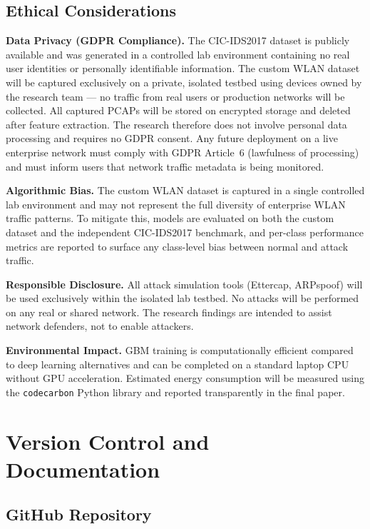 \documentclass[12pt,a4paper]{article}
\begin{document}
\subsection{Ethical Considerations}

\textbf{Data Privacy (GDPR Compliance).}
The CIC-IDS2017 dataset is publicly available and was generated in a controlled
lab environment containing no real user identities or personally identifiable
information. The custom WLAN dataset will be captured exclusively on a private,
isolated testbed using devices owned by the research team --- no traffic from
real users or production networks will be collected. All captured PCAPs will be
stored on encrypted storage and deleted after feature extraction. The research
therefore does not involve personal data processing and requires no GDPR consent.
Any future deployment on a live enterprise network must comply with GDPR Article~6
(lawfulness of processing) and must inform users that network traffic metadata
is being monitored.

\textbf{Algorithmic Bias.}
The custom WLAN dataset is captured in a single controlled lab environment and
may not represent the full diversity of enterprise WLAN traffic patterns.
To mitigate this, models are evaluated on both the custom dataset and the
independent CIC-IDS2017 benchmark, and per-class performance metrics are reported
to surface any class-level bias between normal and attack traffic.

\textbf{Responsible Disclosure.}
All attack simulation tools (Ettercap, ARPspoof) will be used exclusively within
the isolated lab testbed. No attacks will be performed on any real or shared network.
The research findings are intended to assist network defenders, not to enable attackers.

\textbf{Environmental Impact.}
GBM training is computationally efficient compared to deep learning alternatives
and can be completed on a standard laptop CPU without GPU acceleration. Estimated
energy consumption will be measured using the \texttt{codecarbon} Python library
and reported transparently in the final paper.

\section{Version Control and Documentation}

\subsection{GitHub Repository}
\end{document}
